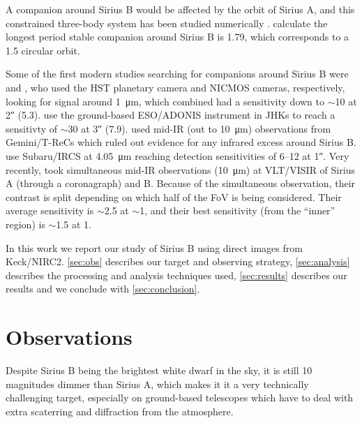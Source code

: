 \documentclass[twocolumn]{aastex631}
\begin{document}
A companion around Sirius B would be affected by the orbit of Sirius A, and this constrained three-body system has been studied numerically \citep{holman_long-term_1999}. \citet{bond_sirius_2017} calculate the longest period stable companion around Sirius B is \qty{1.79}{\year}, which corresponds to a \qty{1.5}{\au} circular orbit.

Some of the first modern studies searching for companions around Sirius B were \citet{schroeder_search_2000} and \citet{kuchner_search_2000}, who used the HST planetary camera and NICMOS cameras, respectively, looking for signal around \qty{1}{\micro\meter}, which combined had a sensitivity down to $\sim$\qty{10}{\mj} at \ang{;;2} (\qty{5.3}{\au}). \citet{bonnet-bidaud_adonis_2008} use the ground-based ESO/ADONIS instrument in JHKs to reach a sensitivty of $\sim$\qty{30}{\mj} at \ang{;;3} (\qty{7.9}{\au}). \citet{skemer_sirius_2011} used mid-IR (out to \qty{10}{\micro\meter}) observations from Gemini/T-ReCs which ruled out evidence for any infrared excess around Sirius B. \citet{thalmann_piercing_2011} use Subaru/IRCS at \qty{4.05}{\micro\meter} reaching detection sensitivities of \qtyrange{6}{12}{\mj} at \ang{;;1}. Very recently, \citet{pathak_high_2021} took simultaneous mid-IR observations (\qty{10}{\micro\meter}) at VLT/VISIR of Sirius A (through a coronagraph) and B. Because of the simultaneous observation, their contrast is split depending on which half of the FoV is being considered. Their average sensitivity is $\sim$\qty{2.5}{\mj} at $\sim$\qty{1}{\au}, and their best sensitivity (from the ``inner'' region) is $\sim$\qty{1.5}{\mj} at \qty{1}{\au}.

In this work we report our study of Sirius B using direct images from Keck/NIRC2. \autoref{sec:obs} describes our target and observing strategy, \autoref{sec:analysis} describes the processing and analysis techniques used, \autoref{sec:results} describes our results and we conclude with \autoref{sec:conclusion}.

\section{Observations} \label{sec:obs}

Despite Sirius B being the brightest white dwarf in the sky, it is still 10 magnitudes dimmer than Sirius A, which makes it it a very technically challenging target, especially on ground-based telescopes which have to deal with extra scaterring and diffraction from the atmosphere.
\end{document}
